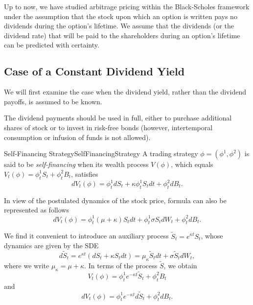 Up to now, we have studied arbitrage pricing within the Black-Scholes framework under the assumption that the stock upon which an option is written pays no dividends during the option’s lifetime. We assume that the dividends (or the dividend rate) that will be paid to the shareholders during an option’s lifetime can be predicted with certainty.

\subsection{Case of a Constant Dividend Yield}
We will first examine the case when the dividend yield, rather than the dividend payoffs, is assumed to be known.

The dividend payments should be used in full, either to purchase additional shares of stock or to invest in risk-free bonds (however, intertemporal consumption or infusion of funds is not allowed).

\begin{defn}{Self-Financing Strategy}{SelfFinancingStrategy}
	A trading strategy \(\phi = (\phi^1, \phi^2)\) is said to be \textit{self-financing} when its wealth process \(V(\phi)\), which equals \(V_t(\phi) = \phi^1_t S_t + \phi^2_t B_t\), satisfies
	\begin{equation}
		dV_t(\phi) = \phi^1_t dS_t + \kappa \phi^1_t S_t dt + \phi^2_t dB_t.
		\label{eq:WealthDynamicsBasic}
	\end{equation}
\end{defn}

In view of the postulated dynamics of the stock price, formula  can also be represented as follows
\begin{equation}
	dV_t(\phi) = \phi^1_t(\mu + \kappa)S_t dt + \phi^1_t \sigma S_t dW_t + \phi^2_t dB_t.
	\label{eq:WealthDynamicsExpanded}
\end{equation}

We find it convenient to introduce an auxiliary process \(\tilde{S}_t = e^{\kappa t} S_t\), whose dynamics are given by the SDE
\begin{equation}
	d\tilde{S}_t = e^{\kappa t}(dS_t + \kappa S_t dt) = \mu_\kappa \tilde{S}_t dt + \sigma \tilde{S}_t dW_t,
	\label{eq:AuxiliaryProcessDynamics}
\end{equation}
where we write \(\mu_\kappa = \mu + \kappa\). In terms of the process \(\tilde{S}\), we obtain
\begin{equation}
	V_t(\phi) = \phi^1_t e^{-\kappa t} \tilde{S}_t + \phi^2_t B_t
	\label{eq:WealthProcessAuxiliary}
\end{equation}
and
\begin{equation}
	dV_t(\phi) = \phi^1_t e^{-\kappa t} d\tilde{S}_t + \phi^2_t dB_t.
	\label{eq:WealthDifferentialAuxiliary}
\end{equation}

